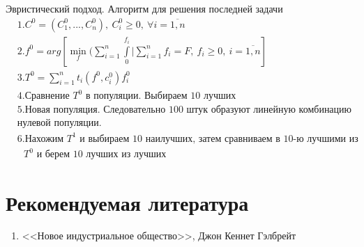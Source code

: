 \documentclass[12pt,a4paper,titlepage,oneside]{book}
\theoremstyle{definition}
\theoremstyle{plain}
\theoremstyle{remark}
\theoremstyle{remark}
\theoremstyle{plain}
\theoremstyle{plain}
\begin{document}
Эвристический подход.
Алгоритм для решения последней задачи 
\begin{align*}
&1.  C^0=(C_1^0,...,C_n^0), \: C_i^0 \geqslant 0, \: \forall i=\overline{1,n} \\
&2.  f^0=arg \left [ \min \limits_{f} (\sum \limits_{i=1}^n  \int \limits_{0}^{f_i} |\sum \limits_{i=1}^n f_i=F, \: f_i \geqslant 0, \: i=\overline{1,n} \right ] \\
&3. T^0= \sum \limits_{i=1}^n t_i(f^0, c_i^0)f_i^0\\
&4. \text{Сравнение $T^0$ в популяции. Выбираем 10 лучших} \\
&5. \text{Новая популяция. Следовательно 100 штук образуют линейную комбинацию}\\
&\text{нулевой популяции.} \\
&6. \text{Нахожим $T^1$ и выбираем 10 наилучших, затем сравниваем в 10-ю лучшими из}\\
&\text{ $T^0$ и берем 10 лучших из лучших}
\end{align*}



\chapter{Рекомендуемая литература}
\begin{enumerate}
\item <<Новое индустриальное общество>>, Джон Кеннет Гэлбрейт
\end{enumerate}
\end{document}
